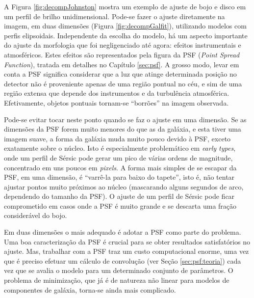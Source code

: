 A Figura \ref{fig:decompJohnston} mostra um exemplo de ajuste de bojo e disco em
um perfil de brilho unidimensional. Pode-se fazer o ajuste diretamente na
imagem, em duas dimensões (Figura \ref{fig:decompGalfit}), utilizando modelos
com perfis elipsoidais. Independente da escolha do modelo, há um aspecto
importante do ajuste da morfologia que foi negligenciado até agora: efeitos
instrumentais e atmosféricos. Estes efeitos são representados pela figura da PSF
({\em Point Spread Function}), tratada em detalhes no Capítulo \ref{sec:psf}. A
grosso modo, levar em conta a PSF significa considerar que a luz que atinge
determinada posição no detector não é proveniente apenas de uma região pontual
no céu, e sim de uma região extensa que depende dos instrumentos e da
turbulência atmosférica. Efetivamente, objetos pontuais tornam-se ``borrões'' na
imagem observada.

Pode-se evitar tocar neste ponto quando se faz o ajuste em uma dimensão.
Se as dimensões da PSF forem muito menores do que as da galáxia, e esta tiver
uma imagem suave, a forma da galáxia muda muito pouco devido à PSF, exceto
exatamente sobre o núcleo. Isto é especialmente problemático em {\em early
types}, onde um perfil de Sérsic pode gerar um pico de várias ordens de
magnitude, concentrado em uns poucos em {\em pixels}. A forma mais simples de se
escapar da PSF, em uma dimensão, é ``varrê-la para baixo do tapete'', isto é,
não tentar ajustar pontos muito próximos ao núcleo (mascarando alguns segundos
de arco, dependendo do tamanho da PSF). O ajuste de um perfil de Sérsic pode
ficar comprometido em casos onde a PSF é muito grande e se descarta uma fração
considerável do bojo.

Em duas dimensões o mais adequado é adotar a PSF como parte do problema. Uma boa
caracterização da PSF é crucial para se obter resultados satisfatórios no
ajuste. Mas, trabalhar com a PSF traz um custo computacional enorme, uma vez que
é preciso efetuar um cálculo de convolução (ver Seção \ref{sec:psf:teoria}) cada
vez que se avalia o modelo para um determinado conjunto de parâmetros. O
problema de minimização, que já é de natureza não linear para modelos de
componentes de galáxia, torna-se ainda mais complicado.


